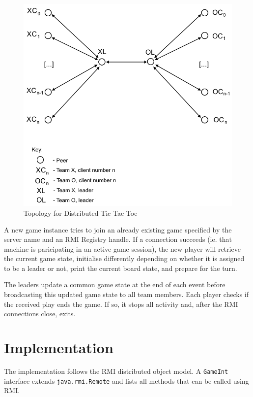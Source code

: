 \documentclass[conference]{IEEEtran}
\begin{document}
\begin{figure}[h]
	\includegraphics[width=\linewidth]{images/DAS-topology.png}
	\caption{Topology for Distributed Tic Tac Toe}
	\label{fig:topology1}
\end{figure}

A new game instance tries to join an already existing game specified
by the server name and an RMI Registry handle. If a connection
succeeds (ie. that machine is paricipating in an active game session),
the new player will retrieve the current game state, initialise
differently depending on whether it is assigned to be a leader or not, print the current board state, and prepare for the turn.

The leaders update a common game state at the end of each event before
broadcasting this updated game state to all team members. Each player
checks if the received play ends the game. If so, it stops all
activity and, after the RMI connections close, exits.

\section{Implementation} %

The implementation follows the RMI distributed object model. A
\texttt{GameInt} interface extends \texttt{java.rmi.Remote} and lists
all methods that can be called using RMI.
\end{document}
